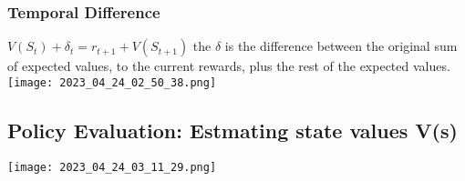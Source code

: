 \documentclass[main.tex,fontsize=8pt,paper=a4,paper=portrait,DIV=calc,]{scrartcl}
\begin{document}
\subsubsection{Temporal Difference}
\(V(S_t) + \delta_t = r_{t+1} +V(S_{t+1})\)\newline
the \(\delta\) is the difference between the original sum of expected values, to the current rewards, plus the rest of the expected values.\newline
\texttt{[image: 2023\_04\_24\_02\_50\_38.png]}

\subsection{Policy Evaluation: Estmating state values V(s)}
\texttt{[image: 2023\_04\_24\_03\_11\_29.png]}
\end{document}
